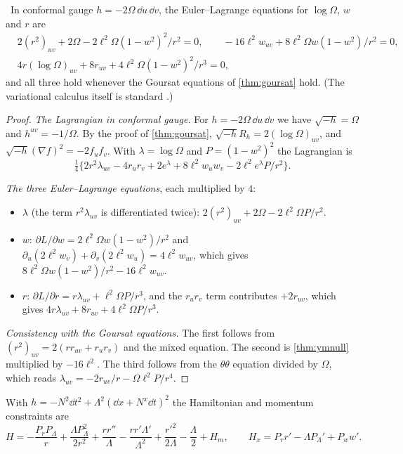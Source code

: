 \begin{proposition}\label{prop:canEL}\ver\
In conformal gauge $h=-2\Omega\,\dd u\,\dd v$, the Euler--Lagrange equations for $\log\Omega$, $w$ and $r$ are
\begin{align*}
&2(r^2)_{uv}+2\Omega-2\ell^2\Omega(1-w^2)^2/r^2=0,\qquad -16\ell^2w_{uv}+8\ell^2\Omega w(1-w^2)/r^2=0,\\
&4r(\log\Omega)_{uv}+8r_{uv}+4\ell^2\Omega(1-w^2)^2/r^3=0,
\end{align*}
and all three hold whenever the Goursat equations of \cref{thm:goursat} hold. (The variational calculus itself is standard \ext.)
\end{proposition}
\begin{proof}
\emph{The Lagrangian in conformal gauge.} For $h=-2\Omega\,\dd u\,\dd v$ we have $\sqrt{-h}=\Omega$ and $h^{uv}=-1/\Omega$. By the proof of \cref{thm:goursat}, $\sqrt{-h}R_h=2(\log\Omega)_{uv}$, and $\sqrt{-h}(\nabla f)^2=-2f_uf_v$. With $\lambda=\log\Omega$ and $P=(1-w^2)^2$ the Lagrangian is
\[
\tfrac14\bigl\{2r^2\lambda_{uv}-4r_ur_v+2e^\lambda+8\ell^2w_uw_v-2\ell^2e^\lambda P/r^2\bigr\}.
\]

\emph{The three Euler--Lagrange equations}, each multiplied by $4$:
\begin{itemize}[nosep]
\item $\lambda$ (the term $r^2\lambda_{uv}$ is differentiated twice): $2(r^2)_{uv}+2\Omega-2\ell^2\Omega P/r^2$.
\item $w$: $\partial L/\partial w=2\ell^2\Omega w(1-w^2)/r^2$ and $\partial_u(2\ell^2w_v)+\partial_v(2\ell^2w_u)=4\ell^2w_{uv}$, which gives $8\ell^2\Omega w(1-w^2)/r^2-16\ell^2w_{uv}$.
\item $r$: $\partial L/\partial r=r\lambda_{uv}+\ell^2\Omega P/r^3$, and the $r_ur_v$ term contributes $+2r_{uv}$, which gives $4r\lambda_{uv}+8r_{uv}+4\ell^2\Omega P/r^3$.
\end{itemize}

\emph{Consistency with the Goursat equations.} The first follows from $(r^2)_{uv}=2(rr_{uv}+r_ur_v)$ and the mixed equation. The second is \cref{thm:ymnull} multiplied by $-16\ell^2$. The third follows from the $\theta\theta$ equation divided by $\Omega$, which reads $\lambda_{uv}=-2r_{uv}/r-\Omega\ell^2P/r^4$.
\end{proof}


With $h=-N^2\dd t^2+\Lambda^2(\dd x+N^x\dd t)^2$ the Hamiltonian and momentum constraints are
\[
H=-\frac{P_rP_\Lambda}r+\frac{\Lambda P_\Lambda^2}{2r^2}+\frac{rr''}\Lambda-\frac{rr'\Lambda'}{\Lambda^2}+\frac{r'^2}{2\Lambda}-\frac\Lambda2+H_m,\qquad H_x=P_rr'-\Lambda P_\Lambda'+P_ww'.
\]

